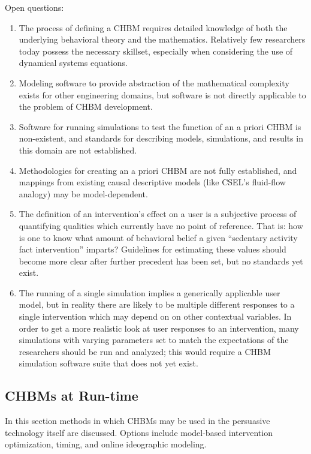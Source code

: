 \documentclass[runningheads,a4paper]{llncs}
\begin{document}
Open questions:
\begin{enumerate}
    \item The process of defining a CHBM requires detailed knowledge of both the underlying behavioral theory and the mathematics. Relatively few researchers today possess the necessary skillset, especially when considering the use of dynamical systems equations.
    \item Modeling software to provide abstraction of the mathematical complexity exists for other engineering domains, but software is not directly applicable to the problem of CHBM development. %
    \item Software for running simulations to test the function of an a priori CHBM is non-existent, and standards for describing models, simulations, and results in this domain are not established.
    \item Methodologies for creating an a priori CHBM are not fully established, and mappings from existing causal descriptive models (like CSEL's fluid-flow analogy) may be model-dependent.
    \item The definition of an intervention's effect on a user is a subjective process of quantifying qualities which currently have no point of reference.
That is: how is one to know what amount of behavioral belief a given ``sedentary activity fact intervention'' imparts?
Guidelines for estimating these values should become more clear after further precedent has been set, but no standards yet exist.
  \item The running of a single simulation implies a generically applicable user model, but in reality there are likely to be multiple different responses to a single intervention which may depend on on other contextual variables. 
In order to get a more realistic look at user responses to an intervention, many simulations with varying parameters set to match the expectations of the researchers should be run and analyzed; this would require a CHBM simulation software suite that does not yet exist.
\end{enumerate}


\subsection{CHBMs at Run-time}
In this section methods in which CHBMs may be used in the persuasive technology itself are discussed. 
Options include model-based intervention optimization, timing, and online ideographic modeling.
\end{document}
